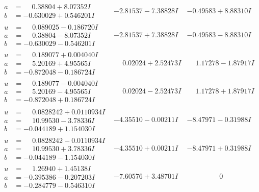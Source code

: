 \documentclass[1p]{elsarticle_modified}
\theoremstyle{definition}
\begin{document}
$$\begin{array}{c|c|c}
\begin{aligned}
a &= \phantom{-}0.38804 + 8.07352 I \\
b &= -0.630029 + 0.546201 I\end{aligned}
 & -2.81537 - 7.38828 I & -0.49583 + 8.88310 I \\ \hline\begin{aligned}
u &= \phantom{-}0.089025 - 0.186720 I \\
a &= \phantom{-}0.38804 - 8.07352 I \\
b &= -0.630029 - 0.546201 I\end{aligned}
 & -2.81537 + 7.38828 I & -0.49583 - 8.88310 I \\ \hline\begin{aligned}
u &= \phantom{-}0.189077 + 0.004040 I \\
a &= \phantom{-}5.20169 + 4.95565 I \\
b &= -0.872048 - 0.186724 I\end{aligned}
 & \phantom{-}0.02024 + 2.52473 I & \phantom{-}1.17278 - 1.87917 I \\ \hline\begin{aligned}
u &= \phantom{-}0.189077 - 0.004040 I \\
a &= \phantom{-}5.20169 - 4.95565 I \\
b &= -0.872048 + 0.186724 I\end{aligned}
 & \phantom{-}0.02024 - 2.52473 I & \phantom{-}1.17278 + 1.87917 I \\ \hline\begin{aligned}
u &= \phantom{-}0.0828242 + 0.0110934 I \\
a &= \phantom{-}10.99530 - 3.78336 I \\
b &= -0.044189 + 1.154030 I\end{aligned}
 & -4.35510 - 0.00211 I & -8.47971 - 0.31988 I \\ \hline\begin{aligned}
u &= \phantom{-}0.0828242 - 0.0110934 I \\
a &= \phantom{-}10.99530 + 3.78336 I \\
b &= -0.044189 - 1.154030 I\end{aligned}
 & -4.35510 + 0.00211 I & -8.47971 + 0.31988 I \\ \hline\begin{aligned}
u &= \phantom{-}1.26940 + 1.45138 I \\
a &= -0.395386 - 0.207203 I \\
b &= -0.284779 - 0.546310 I\end{aligned}
 & -7.60576 + 3.48701 I & \phantom{-0.000000 } 0\\

\end{array}$$
\end{document}

